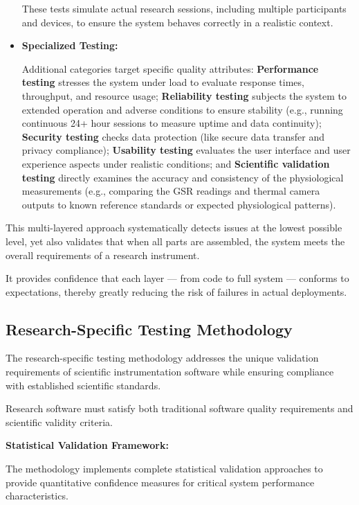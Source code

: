 \begin{itemize}
These tests simulate actual research sessions, including multiple participants and
devices, to ensure the system behaves correctly in a realistic context.

\item \textbf{Specialized Testing:}

Additional categories target specific quality attributes: \textbf{Performance
testing}
 stresses the system under load to evaluate response times, throughput, and resource
 usage; \textbf{Reliability testing}
 subjects the system to extended operation and adverse conditions to ensure stability
 (e.g., running continuous 24+ hour sessions to measure uptime and data continuity);
 \textbf{Security testing}
 checks data protection (like secure data transfer and privacy compliance);
 \textbf{Usability testing}
 evaluates the user interface and user experience aspects under realistic conditions;
 and \textbf{Scientific validation testing}
 directly examines the accuracy and consistency of the physiological measurements
 (e.g., comparing the GSR readings and thermal camera outputs to known reference
 standards or expected physiological patterns).

\end{itemize}

This multi-layered approach systematically detects issues at the lowest possible
level, yet also validates that when all parts are assembled, the system meets the
overall requirements of a research instrument.

It provides confidence that each layer --- from code to full system --- conforms to
expectations, thereby greatly reducing the risk of failures in actual deployments.

\subsection{Research-Specific Testing Methodology}

The research-specific testing methodology addresses the unique validation
requirements of scientific instrumentation software while ensuring compliance with
established scientific standards.

Research software must satisfy both traditional software quality requirements and
scientific validity criteria.

\textbf{Statistical Validation Framework:}

The methodology implements complete statistical validation approaches to provide
quantitative confidence measures for critical system performance characteristics.

